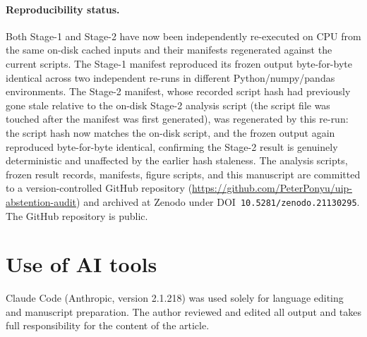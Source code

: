 \documentclass[11pt]{article}
\begin{document}
\paragraph{Reproducibility status.} Both Stage-1 and Stage-2 have now
been independently re-executed on CPU from the same on-disk cached inputs and
their manifests regenerated against the current scripts. The Stage-1 manifest
reproduced its frozen output
byte-for-byte identical across two independent
re-runs in different Python/numpy/pandas environments. The Stage-2 manifest, whose recorded script hash had previously
gone stale relative to the on-disk Stage-2 analysis script (the script file was
touched after the manifest was first generated), was regenerated by this re-run: the script
hash now matches the on-disk script, and the frozen output again reproduced byte-for-byte
identical, confirming the Stage-2 result is
genuinely deterministic and unaffected by the earlier hash staleness. The
analysis scripts, frozen result records, manifests, figure scripts, and this manuscript are
committed to a version-controlled GitHub repository
(\url{https://github.com/PeterPonyu/uip-abstention-audit}) and archived at Zenodo under
DOI~\texttt{10.5281/zenodo.21130295}. The GitHub repository is public.

\section*{Use of AI tools}
Claude Code (Anthropic, version 2.1.218) was used solely for language editing and manuscript
preparation. The author reviewed and edited all output and takes full responsibility for the
content of the article.



\end{document}
